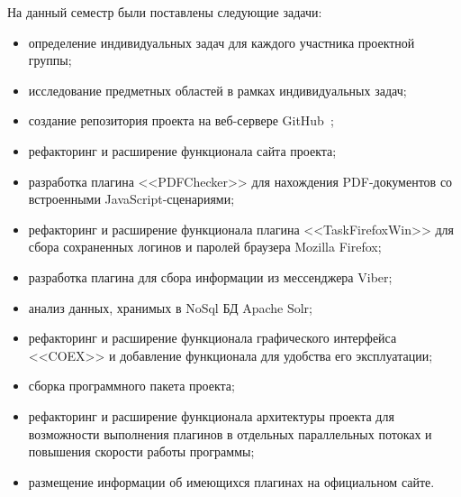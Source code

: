 На данный семестр были поставлены следующие задачи:

\begin{itemize}
  \item определение индивидуальных задач для каждого участника проектной группы;
  \item исследование предметных областей в рамках индивидуальных задач; 
  \item создание репозитория проекта на веб-сервере GitHub~\cite{github};
  \item рефакторинг и расширение функционала сайта проекта;
  \item разработка плагина <<PDFChecker>> для нахождения PDF-документов со встроенными JavaScript-сценариями;
  \item рефакторинг и расширение функционала плагина <<TaskFirefoxWin>> для сбора сохраненных логинов и паролей браузера Mozilla Firefox;
  \item разработка плагина для сбора информации из мессенджера Viber;
  \item анализ данных, хранимых в NoSql БД Apache Solr;
  \item рефакторинг и расширение функционала графического интерфейса <<COEX>> и добавление функционала для удобства его эксплуатации;
  \item сборка программного пакета проекта;  
  \item рефакторинг и расширение функционала архитектуры проекта для возможности выполнения плагинов в отдельных параллельных потоках и повышения скорости работы программы;
  \item размещение информации об имеющихся плагинах на официальном сайте.
\end{itemize}
